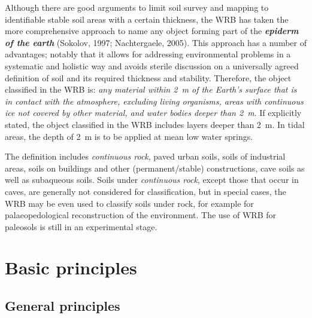 \documentclass[
  letterpaper,
  DIV=11,
  numbers=noendperiod]{scrreprt}
\begin{document}
Although there are good arguments to limit soil survey and mapping to
identifiable stable soil areas with a certain thickness, the WRB has
taken the more comprehensive approach to name any object forming part of
the \textbf{\emph{epiderm of the earth}} (Sokolov, 1997; Nachtergaele,
2005). This approach has a number of advantages; notably that it allows
for addressing environmental problems in a systematic and holistic way
and avoids sterile discussion on a universally agreed definition of soil
and its required thickness and stability. Therefore, the object
classified in the WRB is: \emph{any material within 2~m of the Earth's
surface that is in contact with the atmosphere, excluding living
organisms, areas with continuous ice not covered by other material, and
water bodies deeper than 2~m}. If explicitly stated, the object
classified in the WRB includes layers deeper than 2~m. In tidal areas,
the depth of 2~m is to be applied at mean low water springs.

The definition includes \emph{continuous rock}, paved urban soils, soils
of industrial areas, soils on buildings and other (permanent/stable)
constructions, cave soils as well as subaqueous soils. Soils under
\emph{continuous rock}, except those that occur in caves, are generally
not considered for classification, but in special cases, the WRB may be
even used to classify soils under rock, for example for
palaeopedological reconstruction of the environment. The use of WRB for
paleosols is still in an experimental stage.

\hypertarget{basic-principles}{%
\section{Basic principles}\label{basic-principles}}

\hypertarget{general-principles}{%
\subsection{General principles}\label{general-principles}}
\end{document}
